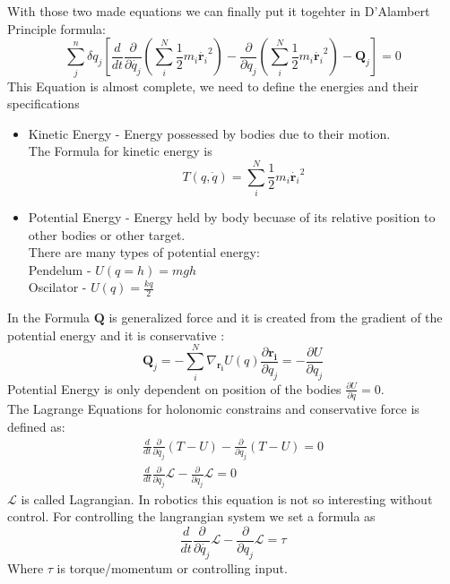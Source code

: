 With those two made equations we can finally put it togehter in D'Alambert Principle formula:
\begin{equation}
	\sum_j^n{\delta q_j\left[\frac{d}{dt}\frac{\partial}{\partial \dot{q_j}}\left(\sum_i^N\frac{1}{2}m_i\dot{\mathbf{r}_i}^2\right)-\frac{\partial}{\partial q_j}\left(\sum_i^N\frac{1}{2}m_i\dot{\mathbf{r}_i}^2\right)- \mathbf{Q}_j\right]} =0 
\end{equation}
This Equation is almost complete, we need to define the energies and their specifications

\begin{itemize}
	\item Kinetic Energy - Energy possessed by bodies due to their motion.\\
	The Formula for kinetic energy is
	\begin{equation}
		T(q,\dot{q}) = \sum_i^N\frac{1}{2}m_i\dot{\mathbf{r}_i}^2
	\end{equation}
	\item Potential Energy - Energy held by body becuase of its relative position to other bodies or other target.\\
	There are many types of potential energy:\\
	Pendelum - $U(q=h)=mgh$\\
	Oscilator - $U(q)=\frac{kq}{2}$ 
\end{itemize}
In the Formula $\mathbf{Q}$ is generalized force and it is created from the gradient of the potential energy and it is conservative :
\begin{equation}
	\mathbf{Q}_j =- \sum^N_i \nabla_{\mathbf{r_i}}U(q)\frac{\partial\mathbf{r_i}}{\partial q_j}= -\frac{\partial U}{\partial q_j}
\end{equation} 
Potential Energy is only dependent on position of the bodies $\frac{\partial U}{\partial \dot{q}} = 0$.\\
The Lagrange Equations for holonomic constrains and conservative force is defined as:
\begin{eqnarray}
\frac{d}{dt}\frac{\partial}{\partial \dot{q_j}}\left(T-U\right)-\frac{\partial}{\partial q_j}\left(T-U\right) =0\\
\frac{d}{dt}\frac{\partial}{\partial \dot{q_j}}\mathcal{L}-\frac{\partial}{\partial q_j}\mathcal{L} =0
\end{eqnarray}
$\mathcal{L}$ is called Lagrangian.
In robotics this equation is not so interesting without control. For controlling the langrangian system we set a formula as 
\begin{equation}
	\frac{d}{dt}\frac{\partial}{\partial \dot{q_j}}\mathcal{L}-\frac{\partial}{\partial q_j}\mathcal{L} =\tau
\end{equation}
Where $\tau$ is torque/momentum or controlling input. 

